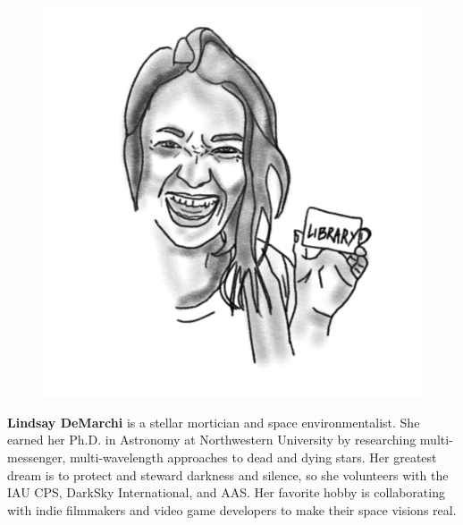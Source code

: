 \begin{figure}
\includegraphics[width=0.9\linewidth]{portraits/lindsay.png}
\end{figure}
\textbf{Lindsay DeMarchi} is a stellar mortician and space environmentalist. She earned her Ph.D. in Astronomy at Northwestern University by researching multi-messenger, multi-wavelength approaches to dead and dying stars. Her greatest dream is to protect and steward darkness and silence, so she volunteers with the IAU CPS, DarkSky International, and AAS. Her favorite hobby is collaborating with indie filmmakers and video game developers to make their space visions real. \\
\\


